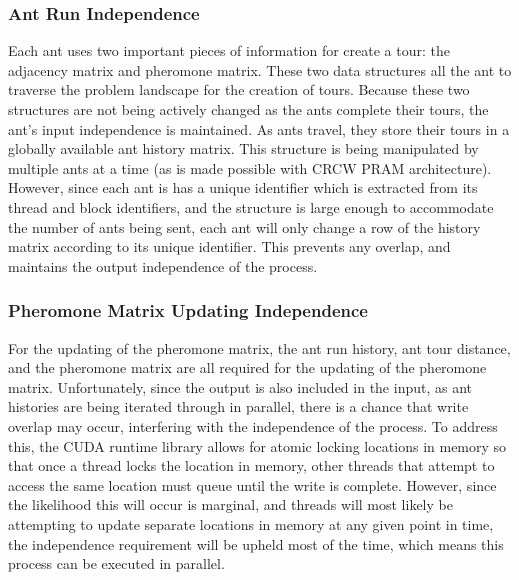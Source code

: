 \documentclass[11pt]{report}
\begin{document}
            \subsubsection{Ant Run Independence}
            Each ant uses two important pieces of information for create a tour: the adjacency matrix and pheromone matrix. These two data structures all the ant to traverse the problem landscape for the creation of tours. Because these two structures are not being actively changed as the ants complete their tours, the ant's input independence is maintained. As ants travel, they store their tours in a globally available ant history matrix. This structure is being manipulated by multiple ants at a time (as is made possible with CRCW PRAM architecture). However, since each ant is has a unique identifier which is extracted from its thread and block identifiers, and the structure is large enough to accommodate the number of ants being sent, each ant will only change a row of the history matrix according to its unique identifier. This prevents any overlap, and maintains the output independence of the process.
            
            \subsubsection{Pheromone Matrix Updating Independence}
            For the updating of the pheromone matrix, the ant run history, ant tour distance, and the pheromone matrix are all required for the updating of the pheromone matrix. Unfortunately, since the output is also included in the input, as ant histories are being iterated through in parallel, there is a chance that write overlap may occur, interfering with the independence of the process. To address this, the CUDA runtime library allows for atomic locking locations in memory so that once a thread locks the location in memory, other threads that attempt to access the same location must queue until the write is complete. However, since the likelihood this will occur is marginal, and threads will most likely be attempting to update separate locations in memory at any given point in time, the independence requirement will be upheld most of the time, which means this process can be executed in parallel. 
\end{document}
